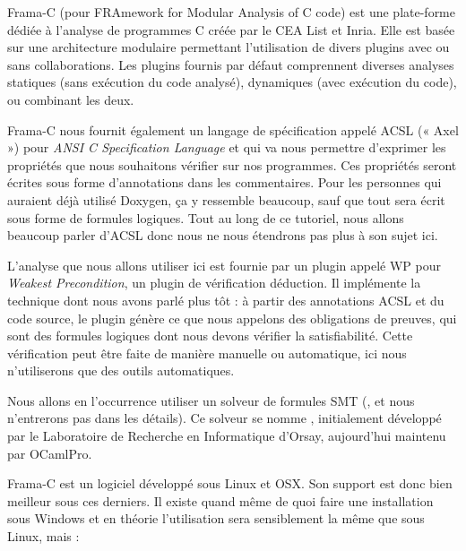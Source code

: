 





Frama-C (pour FRAmework for Modular Analysis of C code) est une plate-forme
 dédiée à l'analyse de programmes C créée par le CEA List et Inria. Elle est
 basée sur une architecture modulaire permettant l'utilisation de divers
 plugins avec ou sans collaborations. Les plugins fournis par défaut
 comprennent diverses analyses statiques (sans exécution du code analysé),
 dynamiques (avec exécution du code), ou combinant les deux.




Frama-C nous fournit également un langage de spécification appelé ACSL (« Axel »)
pour \textit{ANSI C Specification Language} et qui va nous permettre d'exprimer les
propriétés que nous souhaitons vérifier sur nos programmes. Ces propriétés seront
écrites sous forme d'annotations dans les commentaires. Pour les personnes qui
auraient déjà utilisé Doxygen, ça y ressemble beaucoup, sauf que tout sera
écrit sous forme de formules logiques. Tout au long de ce tutoriel, nous allons
beaucoup parler d'ACSL donc nous ne nous étendrons pas plus à son sujet ici.



L'analyse que nous allons utiliser ici est fournie par un plugin appelé WP pour
\textit{Weakest Precondition}, un plugin de vérification déduction. Il implémente
la technique dont nous avons parlé plus tôt :
à partir des annotations ACSL et du code source, le plugin génère ce que nous
appelons des obligations de preuves, qui sont des formules logiques dont nous
devons vérifier la satisfiabilité. Cette vérification peut être faite de manière
manuelle ou automatique, ici nous n'utiliserons que des outils automatiques.



Nous allons en l'occurrence utiliser un solveur de formules SMT
(,
et nous n'entrerons pas dans les détails). Ce solveur se nomme
, initialement développé par le Laboratoire
de Recherche en Informatique d'Orsay, aujourd'hui maintenu par
OCamlPro.





Frama-C est un logiciel développé sous Linux et OSX. Son support est donc bien
meilleur sous ces derniers. Il existe quand même de quoi faire une installation
sous Windows et en théorie l'utilisation sera sensiblement la même que sous
Linux, mais :




